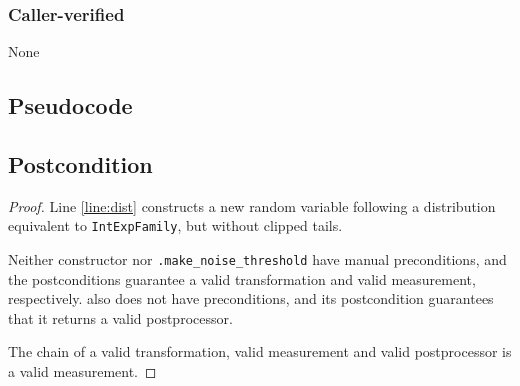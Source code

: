 \documentclass{article}
\begin{document}
\subsubsection*{Caller-verified}
None

\subsection*{Pseudocode}


\subsection*{Postcondition}
\begin{theorem}
\end{theorem}

\begin{proof}
    Line \ref{line:dist} constructs a new random variable following a distribution equivalent to \texttt{IntExpFamily},
    but without clipped tails.

    Neither constructor  nor
    \texttt{.make\_noise\_threshold} have manual preconditions,
    and the postconditions guarantee a valid transformation and valid measurement, respectively.
     also does not have preconditions,
    and its postcondition guarantees that it returns a valid postprocessor.

    The chain of a valid transformation, valid measurement and valid postprocessor is a valid measurement.
\end{proof}
\end{document}
